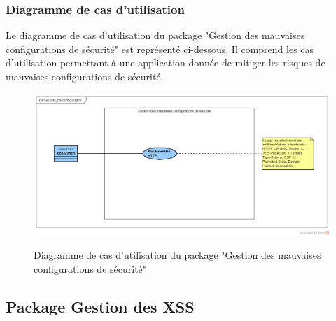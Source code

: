 \subsubsection{Diagramme de cas d'utilisation}
Le diagramme de cas d'utilisation du package "Gestion des mauvaises configurations de sécurité" est représenté ci-dessous. Il comprend les cas d'utilisation permettant à une application donnée de mitiger les risques de mauvaises configurations de sécurité.\\ 
\begin{figure}[H]
	\centering
	\begin{minipage}{12cm}
		\centering
		{\includegraphics[height=0.30\textheight]{fig/Security_misconfiguration-use-case-diagram.png}}
	\end{minipage}
	\caption{Diagramme de cas d'utilisation du package "Gestion des mauvaises configurations de sécurité"}
	\label{fig:7.7}
\end{figure}

\subsection{Package Gestion des XSS }
